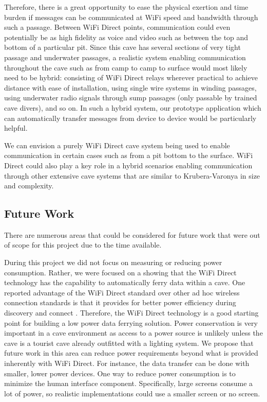 \documentclass[10pt,twocolumn]{article}
\begin{document}
Therefore, there is a great opportunity to ease the physical exertion and time burden if messages can be communicated at WiFi speed and bandwidth through such a passage.
Between WiFi Direct points, communication could even potentially be as high fidelity as voice and video such as between the top and bottom of a particular pit.
Since this cave has several sections of very tight passage and underwater passages,
a realistic system enabling communication throughout the cave such as from camp to camp to surface would most likely need to be hybrid:
consisting of WiFi Direct relays wherever practical to achieve distance with ease of installation, using single wire systems in winding passages, using underwater radio signals through sump passages (only passable by trained cave divers), and so on.
In such a hybrid system, our prototype application which can automatically transfer messages from device to device would be particularly helpful.

We can envision a purely WiFi Direct cave system being used to enable communication in certain cases such as from a pit bottom to the surface.
WiFi Direct could also play a key role in a hybrid scenarios enabling communication through other extensive cave systems that are similar to Krubera-Varonya in size and complexity. 

\subsection{Future Work}
\label{sec:Future Work}
There are numerous areas that could be considered for future work that were out of scope for this project due to the time available.

During this project we did not focus on measuring or reducing power consumption.
Rather, we were focused on a showing that the WiFi Direct technology has the capability to automatically ferry data within a cave.
One reported advantage of the WiFi Direct standard over other ad hoc wireless connection standards is that it provides for better power efficiency during discovery and connect \cite{wifiwhitepaper}.
Therefore, the WiFi Direct technology is a good starting point for building a low power data ferrying solution.
Power conservation is very important in a cave environment as access to a power source is unlikely unless the cave is a tourist cave already outfitted with a lighting system.
We propose that future work in this area can reduce power requirements beyond what is provided inherently with WiFi Direct.
For instance, the data transfer can be done with smaller, lower power devices.
One way to reduce power consumption is to minimize the human interface component.
Specifically, large screens consume a lot of power, so realistic implementations could use a smaller screen or no screen.
\end{document}
